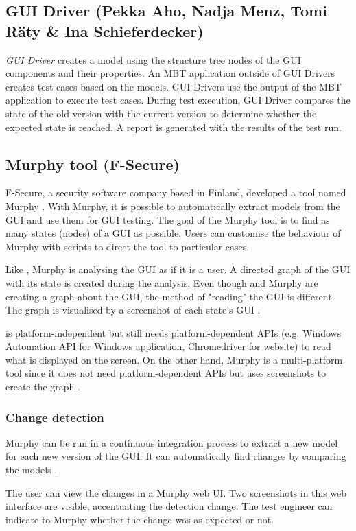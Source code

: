 \subsection{GUI Driver (Pekka Aho, Nadja Menz, Tomi Räty \& Ina Schieferdecker)}  \label{sec:gui-driver}
\emph{GUI Driver} \cite{aho2011automated} creates a model using the structure tree nodes of the GUI components and their properties. An MBT application \cite{mbt-tigris-org} outside of GUI Drivers creates test cases based on the models. GUI Drivers use the output of the MBT application to execute test cases. During test execution, GUI Driver compares the state of the old version with the current version to determine whether the expected state is reached. A report is generated with the results of the test run. 

\subsection{Murphy tool (F-Secure)} \label{sec:murphy-tool}
F-Secure, a security software company based in Finland, developed a tool named Murphy \cite{aho2013industrial}. With Murphy, it is possible to automatically extract models from the GUI and use them for GUI testing. The goal of the Murphy tool is to find as many states (nodes) of a GUI as possible. Users can customise the behaviour of Murphy with scripts to direct the tool to particular cases. 

Like \testar, Murphy is analysing the GUI as if it is a user. A directed graph of the GUI with its state is created during the analysis. Even though \testar and Murphy are creating a graph about the GUI, the method of "reading" the GUI is different. The graph is visualised by a screenshot of each state's GUI \cite{aho2014murphy}.

\testar is platform-independent but still needs platform-dependent APIs (e.g. Windows Automation API for Windows application, Chromedriver for website) to read what is displayed on the screen. On the other hand, Murphy is a multi-platform tool since it does not need platform-dependent APIs but uses screenshots to create the graph \cite{aho2013industrial}.

\subsubsection{Change detection}
Murphy can be run in a continuous integration process to extract a new model for each new version of the GUI. It can automatically find changes by comparing the models \cite{aho2014murphy}.  

The user can view the changes in a Murphy web UI. Two screenshots in this web interface are visible, accentuating the detection change. The test engineer can indicate to Murphy whether the change was as expected or not.